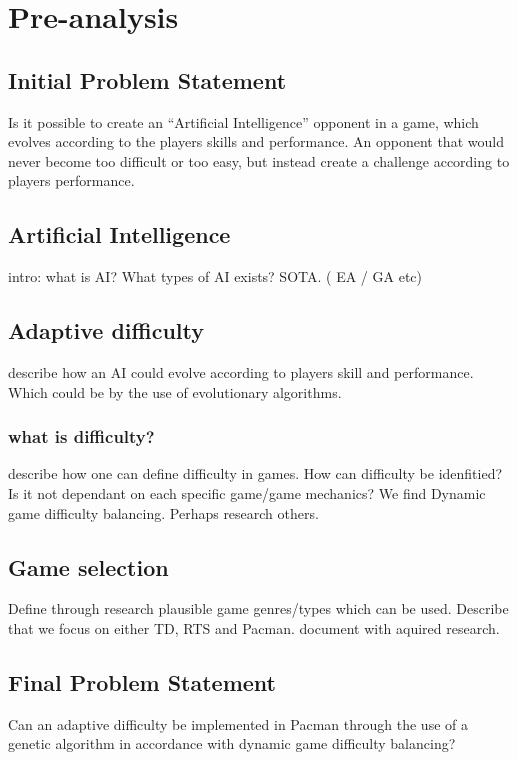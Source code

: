 \section{Pre-analysis} \label{sec:preanalysus}

\subsection{Initial Problem Statement} \label{sec:initialproblemstatement}
Is it possible to create an “Artificial Intelligence” opponent in a game, which evolves according to the players skills and performance.  An opponent that would never become too difficult or too easy, but instead create a challenge according to players performance.


\subsection{Artificial Intelligence} \label{sec:ai}
intro: what is AI? What types of AI exists? SOTA.  ( EA / GA etc)
\subsection{Adaptive difficulty}
describe how an AI could evolve according to players skill and performance. Which could be by the use of evolutionary algorithms.
\subsubsection{what is difficulty?}
describe how one can define difficulty in games. How can difficulty be idenfitied? Is it not dependant on each specific game/game mechanics?
We find Dynamic game difficulty balancing. Perhaps research others.
\subsection{Game selection}
Define through research plausible game genres/types which can be used.
Describe that we focus on either TD, RTS and Pacman. document with aquired research.




\subsection{Final Problem Statement} \label{sec:finalproblemstatement}
Can an adaptive difficulty 	be implemented in Pacman through the use of a genetic algorithm in accordance with dynamic game difficulty balancing?